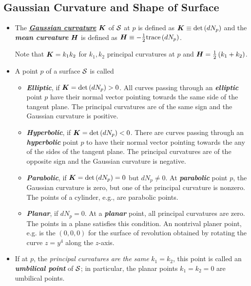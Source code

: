 \documentclass[11pt]{article}
\begin{document}
\subsection{Gaussian Curvature and Shape of Surface}
\begin{itemize}
\item \begin{definition}
The \underline{\emph{\textbf{Gaussian curvature}}} $\boldsymbol{K}$ of ${\mathcal S}$ at $p$ is defined as $\boldsymbol{K}\equiv \det\left(dN_{p}\right)$ and the \emph{\textbf{mean curvature}} $\boldsymbol{H}$ is defined as $\boldsymbol{H}\equiv -\frac{1}{2}\text{trace}\left(dN_{p}\right)$. 
\end{definition}
Note that $\boldsymbol{K} = k_{1}k_{2}$ for $k_{1}, k_{2}$ principal curvatures at $p$ and $\boldsymbol{H} = \frac{1}{2}\left(k_{1}+ k_{2}\right)$.

\item A point $p$ of a surface ${\mathcal S}$ is called
\begin{itemize}
\item \textbf{\emph{Elliptic}}, if $\boldsymbol{K}= \det\left(dN_{p}\right) >0$.
All curves passing through an \emph{\textbf{elliptic}} point $p$ have their normal vector pointing towards the same side of the tangent plane. The principal curvatures are of the same sign and the Gaussian curvature is positive. 

\item \textbf{\emph{Hyperbolic}}, if $\boldsymbol{K}=\det\left(dN_{p}\right) <0$. There are curves passing through an \emph{\textbf{hyperbolic}} point $p$ to have their normal vector pointing towards the any of the sides of the tangent plane. The principal curvatures are of the opposite sign and the Gaussian curvature is negative. 
\item \textbf{\emph{Parabolic}}, if  $\boldsymbol{K}=\det\left(dN_{p}\right) =0$ but $dN_{p}\neq 0$. At \emph{\textbf{parabolic}} point $p$, the Gaussian curvature is zero, but one of the principal curvature is nonzero. The points of a cylinder, e.g., are parabolic points. 
\item \textbf{\emph{Planar}}, if $dN_{p} = 0$. At a \emph{\textbf{planar}} point, all principal curvatures are zero. The points in a plane satisfies this condition. An nontrival planer point, e.g. is the $(0,0,0)$ for the surface of revolution obtained by rotating the curve $z= y^{4}$ along the $z$-axis.  
\end{itemize}

\item \begin{definition}
If at $p$, the \emph{principal curvatures are the same} $k_{1} = k_{2}$, this point is called an \emph{\textbf{umbilical point}} of ${\mathcal S}$; in particular, the planar points $k_{1}=k_{2} = 0$ are umbilical points. \citep{do1976differential}
\end{definition}


\end{itemize}
\end{document}
